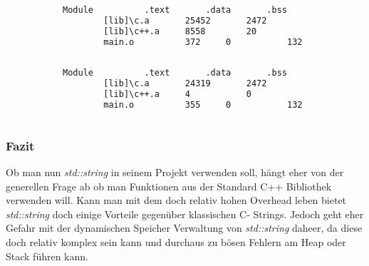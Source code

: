 \documentclass[MES,Master,ngerman]{twbook}%
\begin{document}
\begin{figure}[!htb]
	\begin{subfigure}[b]{0.5\textwidth}
		\begin{lstlisting}[gobble=6, title={std::string}, language=bash, numbers=none]
		Module 			.text		.data		.bss
		[lib]\c.a		25452		2472		11
		[lib]\c++.a		8558		20			204
		main.o			372		0			132
		
		\end{lstlisting}
	\end{subfigure}
	\begin{subfigure}[b]{0.5\textwidth}
		\begin{lstlisting}[gobble=6, title={C- Strings}, language=bash, numbers=none]
		Module 			.text		.data		.bss
		[lib]\c.a		24319		2472		89
		[lib]\c++.a		4			0			0
		main.o			355		0			132
		
		\end{lstlisting}
	\end{subfigure}
\end{figure}
\newpage
\subsubsection{Fazit}
Ob man nun \textit{std::string} in seinem Projekt verwenden soll, hängt eher von der generellen Frage ab ob man Funktionen aus der Standard C++ Bibliothek verwenden will. Kann man mit dem doch relativ hohen Overhead leben bietet \textit{std::string} doch einige Vorteile gegenüber klassischen C- Strings. Jedoch geht eher Gefahr mit der dynamischen Speicher Verwaltung von \textit{std::string} daheer, da diese doch relativ komplex sein kann und durchaus zu bösen Fehlern am Heap oder Stack führen kann.


\newpage
\end{document}
